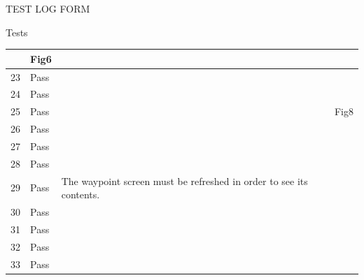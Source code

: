 \documentclass{article}
\begin{document}
\begin{section}{TEST LOG FORM}
\begin{subsection}{Tests}
\begin{tabularx}{\linewidth}{| p{1.5cm} | p{2cm} | p{7.5cm} | p{2cm} | X |}
&
Fig6
\\
\hline

23
&
Pass
&

&

&

\\
\hline

24
&
Pass
&

&

&

\\
\hline

25
&
Pass
&

&

&
Fig8
\\
\hline

26
&
Pass
&

&

&

\\
\hline

27
&
Pass
&

&

&

\\
\hline

28
&
Pass
&

&

&

\\
\hline

29
&
Pass
&
The waypoint screen must be refreshed in order to see its contents.
&

&

\\
\hline

30
&
Pass
&

&

&

\\
\hline

31
&
Pass
&

&

&

\\
\hline

32
&
Pass
&

&

&

\\
\hline

33
&
Pass
&

&

&

\\
\hline


\end{tabularx}
\end{subsection}
\end{section}
\end{document}
